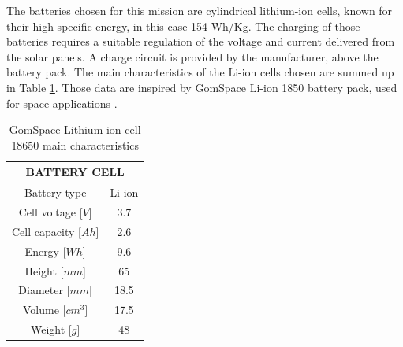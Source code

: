 \documentclass[a4paper, oneside, 11pt]{article}
\begin{document}
The batteries chosen for this mission are cylindrical lithium-ion cells, known for their high specific energy, in this case 154 Wh/Kg. The charging of those batteries requires a suitable regulation of the voltage and current delivered from the solar panels. A charge circuit is provided by the manufacturer, above the battery pack. The main characteristics of the Li-ion cells chosen are summed up in Table \ref{Li-ion_cell_characteristics}. Those data are inspired by GomSpace Li-ion 1850 battery pack, used for space applications \cite{Lithium Ion 18650 cells for space flight products datasheet}.



\begin{table}[h]
 \caption{GomSpace Lithium-ion cell 18650 main characteristics}
 \label{Li-ion_cell_characteristics}
\centering
 \begin{tabular}{| c | c |}
  \hline
	\multicolumn{2}{|c|}{\textbf{BATTERY CELL}}     \\
  \hline
  	Battery type		& Li-ion \\
    Cell voltage [$V$]  & 3.7  \\
    Cell capacity [$Ah$]& 2.6 \\
    Energy [$Wh$]       & 9.6 \\
    Height [$mm$]       & 65 \\
    Diameter [$mm$]     & 18.5 \\
    Volume [$cm^{3}$]       & 17.5 \\
    Weight [$g$]       & 48 \\
  \hline
\end{tabular}
\end{table}
\end{document}
